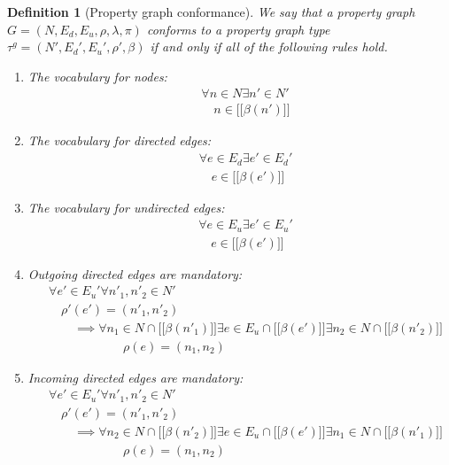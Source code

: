 \documentclass[a4paper]{article}
\newtheorem{definition}[theorem]{Definition}
\newcommand{\gtype}{\tau^g}
\newcommand{\lsem}{\ensuremath{[\![}}
\newcommand{\rsem}{\ensuremath{]\!]}}
\newcommand{\sem}[1]{\ensuremath{\lsem #1 \rsem}}
\begin{document}
\begin{definition}[Property graph conformance]
  We say that a property graph $G = (N, E_d, E_u, \rho, \lambda, \pi)$ \emph{conforms} to a property graph type $\gtype = (N', E_d', E_u', \rho', \beta)$ if and only if all of the following rules hold.

  \begin{enumerate}
    \item The vocabulary for nodes:
    \begin{align*}
      &\forall n \in N \exists n' \in N'\\
      &\quad n \in \sem{\beta(n')}
    \end{align*}
    
    \item The vocabulary for directed edges:
    \begin{align*}
      &\forall e \in E_d \exists e' \in E_d'\\
      &\quad e \in \sem{\beta(e')}
    \end{align*}

    \item The vocabulary for undirected edges:
    \begin{align*}
      &\forall e \in E_u \exists e' \in E_u'\\
      &\quad e \in \sem{\beta(e')}
    \end{align*}
    
    \item Outgoing directed edges are mandatory:
    \begin{align*}
      &\forall e' \in E_u' \forall n'_1, n'_2 \in N'\\
      &\quad\rho'(e') = (n'_1, n'_2)\\
      &\quad\quad\implies {} \forall n_1 \in N \cap \sem{\beta(n'_1)} \exists e \in E_u \cap \sem{\beta(e')} \exists n_2 \in N \cap \sem{\beta(n'_2)}\\
      &\quad\quad\quad\quad\quad\quad\rho(e) = (n_1, n_2)
    \end{align*}

    \item Incoming directed edges are mandatory:
    \begin{align*}
      &\forall e' \in E_u' \forall n'_1, n'_2 \in N'\\
      &\quad\rho'(e') = (n'_1, n'_2)\\
      &\quad\quad\implies {} \forall n_2 \in N \cap \sem{\beta(n'_2)} \exists e \in E_u \cap \sem{\beta(e')} \exists n_1 \in N \cap \sem{\beta(n'_1)}\\
      &\quad\quad\quad\quad\quad\quad\rho(e) = (n_1, n_2)
    \end{align*}
    

\end{enumerate}
\end{definition}
\end{document}
